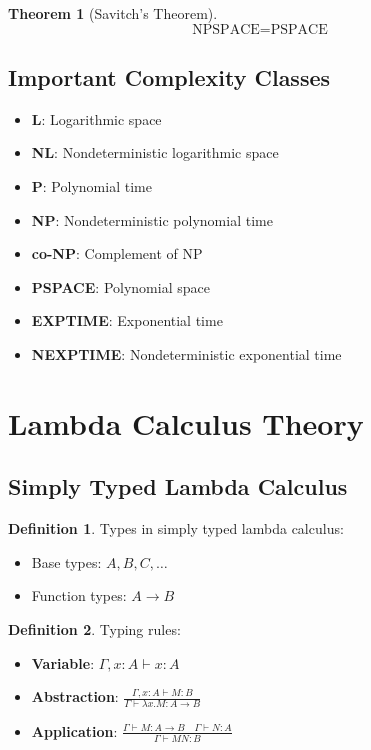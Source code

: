 \documentclass[11pt]{article}
\theoremstyle{definition}
\newtheorem{definition}{Definition}[section]
\newtheorem{theorem}{Theorem}[section]
\begin{document}
\begin{theorem}[Savitch's Theorem]
$$\text{NPSPACE} = \text{PSPACE}$$
\end{theorem}

\subsection{Important Complexity Classes}
\begin{itemize}
    \item \textbf{L}: Logarithmic space
    \item \textbf{NL}: Nondeterministic logarithmic space
    \item \textbf{P}: Polynomial time
    \item \textbf{NP}: Nondeterministic polynomial time
    \item \textbf{co-NP}: Complement of NP
    \item \textbf{PSPACE}: Polynomial space
    \item \textbf{EXPTIME}: Exponential time
    \item \textbf{NEXPTIME}: Nondeterministic exponential time
\end{itemize}

\section{Lambda Calculus Theory}

\subsection{Simply Typed Lambda Calculus}
\begin{definition}
Types in simply typed lambda calculus:
\begin{itemize}
    \item Base types: $A, B, C, \ldots$
    \item Function types: $A \to B$
\end{itemize}
\end{definition}

\begin{definition}
Typing rules:
\begin{itemize}
    \item \textbf{Variable}: $\Gamma, x:A \vdash x : A$
    \item \textbf{Abstraction}: $\frac{\Gamma, x:A \vdash M : B}{\Gamma \vdash \lambda x. M : A \to B}$
    \item \textbf{Application}: $\frac{\Gamma \vdash M : A \to B \quad \Gamma \vdash N : A}{\Gamma \vdash M N : B}$
\end{itemize}
\end{definition}
\end{document}
